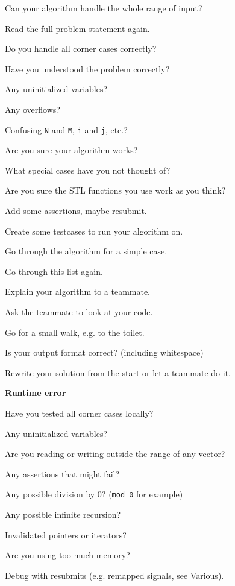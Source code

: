 \documentclass[12pt, a4paper, twoside]{article}
\begin{document}
\noindent
Can your algorithm handle the whole range of input?

\noindent
Read the full problem statement again.

\noindent
Do you handle all corner cases correctly?

\noindent
Have you understood the problem correctly?

\noindent
Any uninitialized variables?

\noindent
Any overflows?

\noindent
Confusing \texttt{N} and \texttt{M}, \texttt{i} and \texttt{j}, etc.?

\noindent
Are you sure your algorithm works?

\noindent
What special cases have you not thought of?

\noindent
Are you sure the STL functions you use work as you think?

\noindent
Add some assertions, maybe resubmit.

\noindent
Create some testcases to run your algorithm on.

\noindent
Go through the algorithm for a simple case.

\noindent
Go through this list again.

\noindent
Explain your algorithm to a teammate.

\noindent
Ask the teammate to look at your code.

\noindent
Go for a small walk, e.g. to the toilet.

\noindent
Is your output format correct? (including whitespace)

\noindent
Rewrite your solution from the start or let a teammate do it.

\noindent
\textbf{Runtime error}

\noindent
Have you tested all corner cases locally?

\noindent
Any uninitialized variables?

\noindent
Are you reading or writing outside the range of any vector?

\noindent
Any assertions that might fail?

\noindent
Any possible division by 0? (\texttt{mod 0} for example)

\noindent
Any possible infinite recursion?

\noindent
Invalidated pointers or iterators?

\noindent
Are you using too much memory?

\noindent
Debug with resubmits (e.g. remapped signals, see Various).
\end{document}
